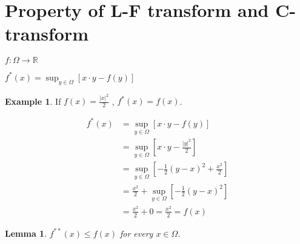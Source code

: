 \documentclass{jsarticle}
\newtheorem{lem}[thm]{Lemma}
\theoremstyle{definition}
\newtheorem{ex}{Example}[section]
\begin{document}
\section{Property of L-F transform and C-transform}
\begin{math}
f:\Omega \to \mathbb{R}
\end{math}

\begin{math}
f^{*}(x) = \displaystyle \sup_{y\in \Omega}{[x \cdot y - f(y)]}
\end{math}

\begin{ex}
If 
\begin{math}
f(x) = \frac{|x|^2}{2}
\end{math}
,  
$f^*(x) = f(x)$.
\end{ex}

\begin{align*}
f^{*}(x) &= \displaystyle \sup_{y\in \Omega}{[x \cdot y - f(y)]} \\
              &= \displaystyle \sup_{y\in \Omega}{[x \cdot y - \frac{|y|^2}{2}]} \\
              &= \displaystyle \sup_{y\in \Omega}{[- \frac{1}{2}(y - x)^2 + \frac{x^2}{2}]} \\
              &= \frac{x^2}{2} + \displaystyle \sup_{y\in \Omega}{[- \frac{1}{2}(y - x)^2 ]} \\
              &= \frac{x^2}{2} + 0 = \frac{x^2}{2} = f(x)
\end{align*}


\begin{lem}
$f^{**}(x) \leq f(x)$ for every $x \in \Omega$.
\end{lem}
\end{document}
